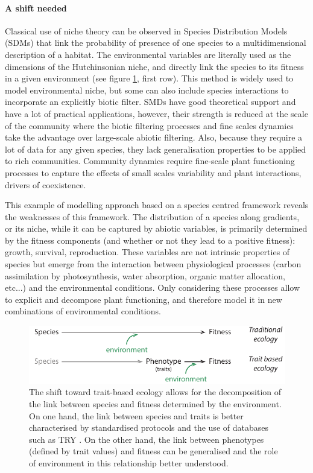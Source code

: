 \paragraph{A shift needed}

Classical use of niche theory can be observed in Species Distribution Models (SDMs) that link the probability of presence of one species to a multidimensional description of a habitat. The environmental variables are literally used as the dimensions of the Hutchinsonian niche, and directly link the species to its fitness in a given environment (see figure \ref{fig:paradigm_shift}, first row). This method is widely used to model environmental niche, but some can also include species interactions to incorporate an explicitly biotic filter. SMDs have good theoretical support and have a lot of practical applications, however, their strength is reduced at the scale of the community where the biotic filtering processes and fine scales dynamics take the advantage over large-scale abiotic filtering. Also, because they require a lot of data for any given species, they lack generalisation properties to be applied to rich communities. Community dynamics require fine-scale plant functioning processes to capture the effects of small scales variability and plant interactions, drivers of coexistence. 

This example of modelling approach based on a species centred framework reveals the weaknesses of this framework. The distribution of a species along gradients, or its niche, while it can be captured by abiotic variables, is primarily determined by the fitness components (and whether or not they lead to a positive fitness): growth, survival, reproduction. These variables are not intrinsic properties of species but emerge from the interaction between physiological processes (carbon assimilation by photosynthesis, water absorption, organic matter allocation, etc...) and the environmental conditions. Only considering these processes allow to explicit and decompose plant functioning, and therefore model it in new combinations of environmental conditions.

\begin{figure}
    \includegraphics[width=1\linewidth]{./2_PP/Figures/Concepts/species_to_fitness.pdf}
  \caption[From discrete to continuous link between species and fitness]{The shift toward trait-based ecology allows for the decomposition of the link between species and fitness determined by the environment. On one hand, the link between species and traits is better characterised by standardised protocols and the use of databases such as TRY \parencite{TRY}. On the other hand, the link between phenotypes (defined by trait values) and fitness can be generalised and the role of environment in this relationship better understood.}
  \label{fig:paradigm_shift}
\end{figure}

